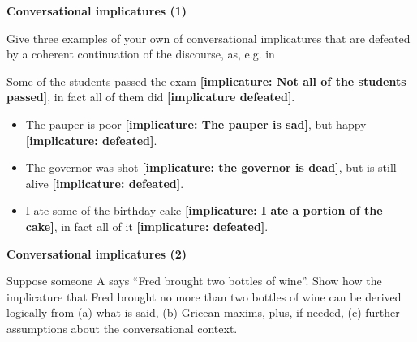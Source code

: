 \documentclass[11pt]{article}
\begin{document}
\vspace*{0.5cm} %

\begin{problem}{2}
\textbf{Conversational implicatures (1)}

Give three examples of your own of conversational implicatures that are defeated by a coherent continuation of the discourse, as, e.g. in 

Some of the students passed the exam \textbf{[implicature: Not all of the students passed]}, in fact all of them did \textbf{[implicature defeated]}.


\end{problem}

\begin{solution}
\begin{itemize}

    \item The pauper is poor \textbf{[implicature: The pauper is sad]}, but happy \textbf{[implicature: defeated]}.

    \item The governor was shot \textbf{[implicature: the governor is dead]}, but is still alive \textbf{[implicature: defeated]}.

    \item I ate some of the birthday cake \textbf{[implicature: I ate a portion of the cake]}, in fact all of it \textbf{[implicature: defeated]}.
\end{itemize}

\end{solution}

\vspace*{0.5cm}

\begin{problem}{3}
\textbf{ Conversational implicatures (2)}

Suppose someone A says ``Fred brought two bottles of wine''. Show how the
implicature that Fred brought no more than two bottles of wine can be derived
logically from (a) what is said, (b) Gricean maxims, plus, if needed, (c) further
assumptions about the conversational context.
\end{problem}
\end{document}
